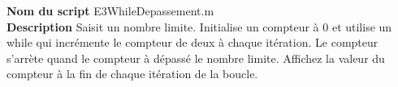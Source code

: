 \textbf{Nom du script}
E3WhileDepassement.m\\
\textbf{Description}
Saisit un nombre limite. Initialise un compteur à 0 et utilise un while qui incrémente le compteur de deux à chaque itération. Le compteur s'arrète quand le compteur à dépassé le nombre limite. Affichez la valeur du compteur à la fin de chaque itération de la boucle.